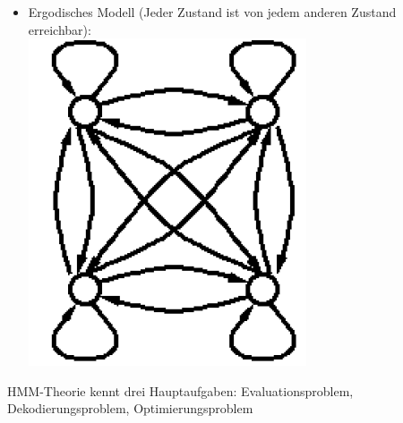 \documentclass[a4paper,10pt,oneside]{article}
\begin{document}
\begin{itemize}
		\item Ergodisches Modell (Jeder Zustand ist von jedem anderen Zustand erreichbar): \\
\includegraphics[scale=0.2]{Grafiken/hmm-em.png} 
	\end{itemize}

HMM-Theorie kennt drei Hauptaufgaben: Evaluationsproblem, Dekodierungsproblem, Optimierungsproblem
\end{document}
